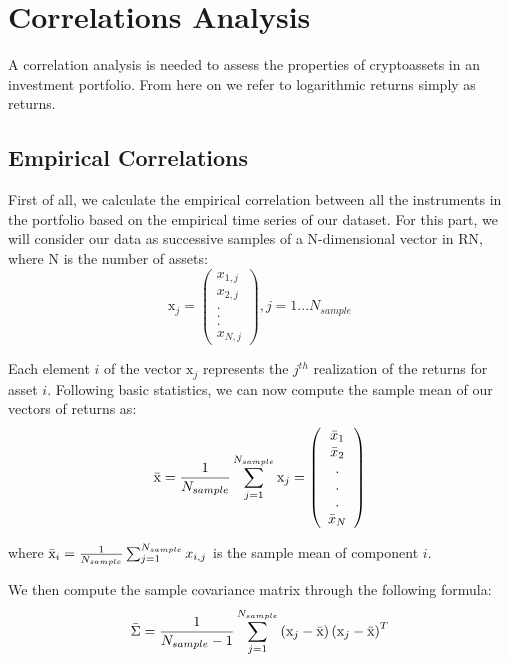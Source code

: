 \chapter{Correlations Analysis}
\label{chpr:ch3}
\bigskip

A correlation analysis is needed to assess the properties of cryptoassets in an investment portfolio. From here on we refer to logarithmic returns simply as returns.

\section{Empirical Correlations}
First of all, we calculate the empirical correlation between all the instruments in the portfolio based on the empirical time series of our dataset.
For this part, we will consider our data as successive samples of a N-dimensional vector in RN, where N is the number of assets:
\begin{equation}
    \text{x}_j = \left( \begin{array}{c}
         x_{1,j} \\
         x_{2,j} \\
         .\\
         .\\
         .\\
         x_{N,j}
    \end{array} \right) , j = 1...N_{sample}
\end{equation}

Each element $i$ of the vector $\text{x}_j$ represents the $j^{th}$ realization of the returns for asset $i$.
Following basic statistics, we can now compute the sample mean of our vectors of returns as:
\begin{equation}
    \Bar{\text{x}} = \frac{1}{N_{sample}} \sum_{{j = 1}}^{N_{sample}} \text{x}_j = \left( \begin{array}{c}
         \Bar{x}_1 \\
         \Bar{x}_2 \\
         .\\
         .\\
         .\\
         \Bar{x}_N
    \end{array} \right)
\end{equation}

where $\Bar{\text{x}}_i = \frac{1}{N_{sample}} \sum_{{j = 1}}^{N_{sample}} x_{i,j}$ is the sample mean of component $i$.

\noindent
We then compute the sample covariance matrix through the following formula:
\begin{equation}
    \Bar{\Sigma} = \frac{1}{N_{sample}-1} \sum_{{j = 1}}^{N_{sample}} \left( \text{x}_j - \Bar{\text{x}} \right) \left( \text{x}_j - \Bar{\text{x}} \right)^T
\end{equation}

